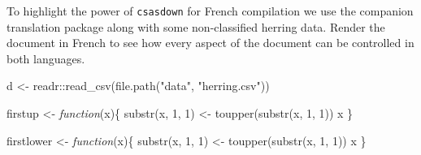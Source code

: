 \documentclass[12pt]{article}\usepackage[]{graphicx}\usepackage[]{color}
\newenvironment{Shaded}{\begin{snugshade}}{\end{snugshade}}
\newcommand{\ControlFlowTok}[1]{\textcolor[rgb]{0.13,0.29,0.53}{\textit{#1}}}
\newcommand{\DecValTok}[1]{\textcolor[rgb]{0.00,0.00,0.81}{#1}}
\newcommand{\FunctionTok}[1]{\textcolor[rgb]{0.00,0.00,0.00}{#1}}
\newcommand{\NormalTok}[1]{#1}
\newcommand{\OtherTok}[1]{\textcolor[rgb]{0.56,0.35,0.01}{#1}}
\newcommand{\SpecialCharTok}[1]{\textcolor[rgb]{0.00,0.00,0.00}{#1}}
\newcommand{\StringTok}[1]{\textcolor[rgb]{0.31,0.60,0.02}{#1}}
\begin{document}
To highlight the power of \texttt{csasdown} for French compilation we use the companion translation package  along with some non-classified herring data. Render the document in French to see how every aspect of the document can be controlled in both languages.
\begin{Shaded}
\begin{Highlighting}[]
\NormalTok{d }\OtherTok{\textless{}{-}}\NormalTok{ readr}\SpecialCharTok{::}\FunctionTok{read\_csv}\NormalTok{(}\FunctionTok{file.path}\NormalTok{(}\StringTok{"data"}\NormalTok{, }\StringTok{"herring.csv"}\NormalTok{))}

\NormalTok{firstup }\OtherTok{\textless{}{-}} \ControlFlowTok{function}\NormalTok{(x)\{}
  \FunctionTok{substr}\NormalTok{(x, }\DecValTok{1}\NormalTok{, }\DecValTok{1}\NormalTok{) }\OtherTok{\textless{}{-}} \FunctionTok{toupper}\NormalTok{(}\FunctionTok{substr}\NormalTok{(x, }\DecValTok{1}\NormalTok{, }\DecValTok{1}\NormalTok{))}
\NormalTok{  x}
\NormalTok{\}}

\NormalTok{firstlower }\OtherTok{\textless{}{-}} \ControlFlowTok{function}\NormalTok{(x)\{}
  \FunctionTok{substr}\NormalTok{(x, }\DecValTok{1}\NormalTok{, }\DecValTok{1}\NormalTok{) }\OtherTok{\textless{}{-}} \FunctionTok{toupper}\NormalTok{(}\FunctionTok{substr}\NormalTok{(x, }\DecValTok{1}\NormalTok{, }\DecValTok{1}\NormalTok{))}
\NormalTok{  x}
\NormalTok{\}}


\end{Highlighting}
\end{Shaded}
\end{document}
